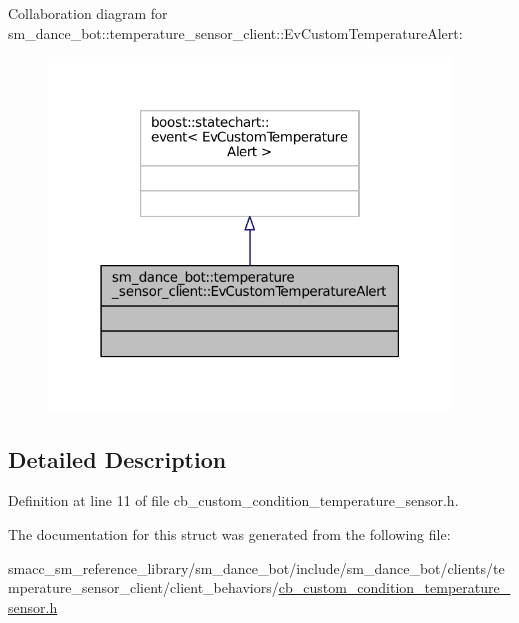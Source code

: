 Collaboration diagram for sm\+\_\+dance\+\_\+bot\+:\+:temperature\+\_\+sensor\+\_\+client\+:\+:Ev\+Custom\+Temperature\+Alert\+:
\nopagebreak
\begin{figure}[H]
\begin{center}
\leavevmode
\includegraphics[width=303pt]{structsm__dance__bot_1_1temperature__sensor__client_1_1EvCustomTemperatureAlert__coll__graph}
\end{center}
\end{figure}


\subsection{Detailed Description}


Definition at line 11 of file cb\+\_\+custom\+\_\+condition\+\_\+temperature\+\_\+sensor.\+h.



The documentation for this struct was generated from the following file\+:\begin{DoxyCompactItemize}
\item 
smacc\+\_\+sm\+\_\+reference\+\_\+library/sm\+\_\+dance\+\_\+bot/include/sm\+\_\+dance\+\_\+bot/clients/temperature\+\_\+sensor\+\_\+client/client\+\_\+behaviors/\hyperlink{cb__custom__condition__temperature__sensor_8h}{cb\+\_\+custom\+\_\+condition\+\_\+temperature\+\_\+sensor.\+h}\end{DoxyCompactItemize}
